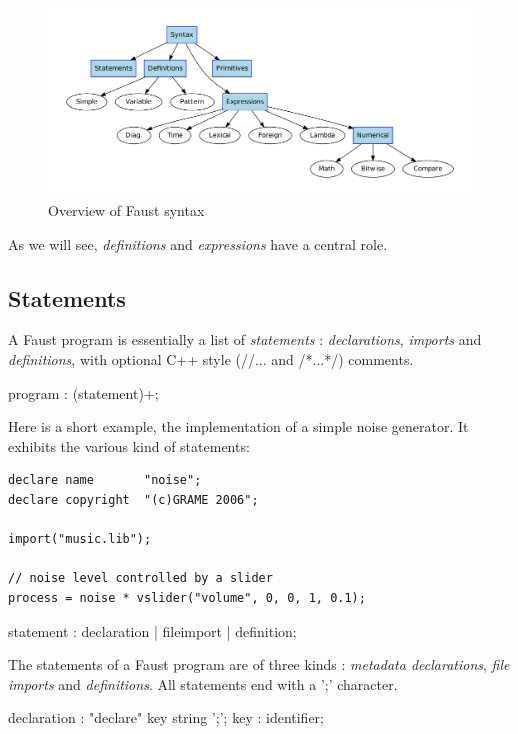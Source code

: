 \documentclass{article}
\begin{document}
\begin{figure}[ht!]
\centering
\includegraphics[scale=0.5]{illustrations/syntax-chart}
\caption{Overview of Faust syntax}
\label{fig:syntax}
\end{figure}

As we will see, \textit{definitions} and \textit{expressions} have a central role.

\subsection{Statements}

A Faust program is essentially a list of \textit{statements} : \textit{declarations}, \textit{imports} and \textit{definitions}, with optional C++ style (//... and /*...*/) comments.
 
\begin{rail}
program : (statement)+;
\end{rail}

Here is a short example, the implementation of a simple noise generator. It exhibits the various kind of statements:
\begin{lstlisting}
declare name       "noise";
declare copyright  "(c)GRAME 2006";

import("music.lib");

// noise level controlled by a slider
process = noise * vslider("volume", 0, 0, 1, 0.1);
\end{lstlisting}
 

\begin{rail}
statement : declaration | fileimport | definition;
\end{rail}
The statements of a Faust program are of three kinds : \textit{metadata declarations}, \textit{file imports} and \textit{definitions}. All statements end with a ';' character.

\begin{rail}
declaration : "declare" key string ';';
key : identifier;
\end{rail}
\end{document}
